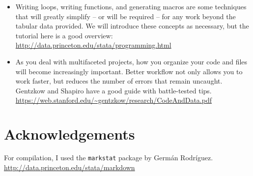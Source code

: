 \documentclass[]{article}
\providecommand{\tightlist}{%
  \setlength{\itemsep}{0pt}\setlength{\parskip}{0pt}}
\begin{document}
\begin{itemize}
\tightlist
\item
  Writing loops, writing functions, and generating macros are some
  techniques that will greatly simplify -- or will be required -- for
  any work beyond the tabular data provided. We will introduce these
  concepts as necessary, but the tutorial here is a good overview:
  \url{http://data.princeton.edu/stata/programming.html}
\item
  As you deal with multifaceted projects, how you organize your code and
  files will become increasingly important. Better workflow not only
  allows you to work faster, but reduces the number of errors that
  remain uncaught. Gentzkow and Shapiro have a good guide with
  battle-tested tips.
  \url{https://web.stanford.edu/~gentzkow/research/CodeAndData.pdf}
\end{itemize}

\section{Acknowledgements}\label{acknowledgements}

For compilation, I used the \texttt{markstat} package by Germán
Rodríguez. \url{http://data.princeton.edu/stata/markdown}
\end{document}
